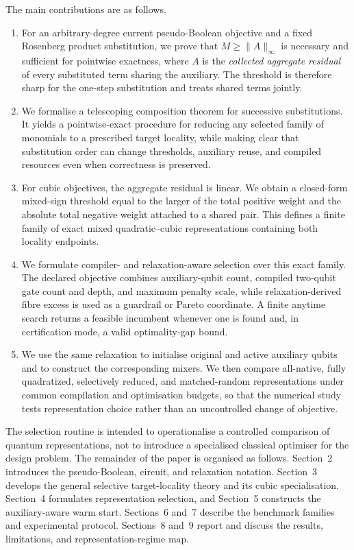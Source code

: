 \documentclass[a4paper,onecolumn,11pt,unpublished]{quantumarticle}
\theoremstyle{remark}
\begin{document}
The main contributions are as follows.
\begin{enumerate}
    \item For an arbitrary-degree current pseudo-Boolean objective and a fixed
    Rosenberg product substitution, we prove that
    $M\geq\lVert A\rVert_{\infty}$ is necessary and sufficient for pointwise
    exactness, where $A$ is the \emph{collected aggregate residual} of every
    substituted term sharing the auxiliary.  The threshold is therefore sharp
    for the one-step substitution and treats shared terms jointly.

    \item We formalise a telescoping composition theorem for successive
    substitutions.  It yields a pointwise-exact procedure for reducing any
    selected family of monomials to a prescribed target locality, while making
    clear that substitution order can change thresholds, auxiliary reuse, and
    compiled resources even when correctness is preserved.

    \item For cubic objectives, the aggregate residual is linear.  We obtain a
    closed-form mixed-sign threshold equal to the larger of the total positive
    weight and the absolute total negative weight attached to a shared pair.
    This defines a finite family of exact mixed quadratic--cubic
    representations containing both locality endpoints.

    \item We formulate compiler- and relaxation-aware selection over this exact
    family.  The declared objective combines auxiliary-qubit count, compiled
    two-qubit gate count and depth, and maximum penalty scale, while
    relaxation-derived fibre excess is used as a guardrail or Pareto
    coordinate.  A finite anytime search returns a feasible incumbent whenever
    one is found and, in certification mode, a valid optimality-gap bound.

    \item We use the same relaxation to initialise original and active
    auxiliary qubits and to construct the corresponding mixers.  We then
    compare all-native, fully quadratized, selectively reduced, and
    matched-random representations under common compilation and optimisation
    budgets, so that the numerical study tests representation choice rather
    than an uncontrolled change of objective.
\end{enumerate}

The selection routine is intended to operationalise a controlled comparison of
quantum representations, not to introduce a specialised classical optimiser
for the design problem.  The remainder of the paper is organised as follows.
Section~2 introduces the pseudo-Boolean, circuit, and relaxation notation.
Section~3 develops the general selective target-locality theory and its cubic
specialisation.  Section~4 formulates representation selection, and Section~5
constructs the auxiliary-aware warm start.  Sections~6 and~7 describe the
benchmark families and experimental protocol.  Sections~8 and~9 report and
discuss the results, limitations, and representation-regime map.
\end{document}
